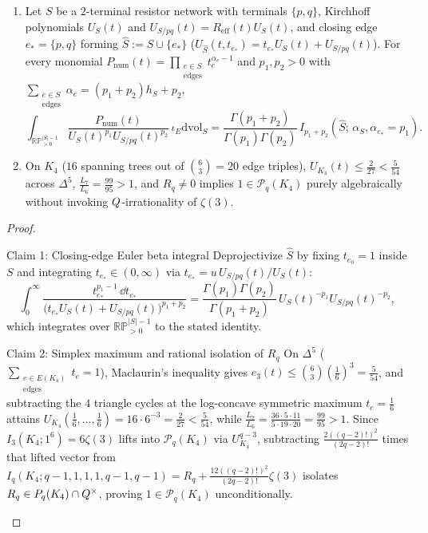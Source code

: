 \begin{lemma}
\label{lem:closing-edge-k4}
\leavevmode
\begin{enumerate}[label=(\arabic*),leftmargin=*]
  \item Let $S$ be a $2$-terminal resistor network with terminals $\{p,q\}$, Kirchhoff polynomials $U_S(t)$ and $U_{S/pq}(t) = R_{\mathrm{eff}}(t)U_S(t)$, and closing edge $e_* = \{p,q\}$ forming $\widehat{S} := S\cup\{e_*\}$ ($U_{\widehat{S}}(t,t_{e_*}) = t_{e_*}U_S(t) + U_{S/pq}(t)$). For every monomial $P_{\mathrm{num}}(t) = \prod_{\substack{e\in S\\\mathrm{edges}}}t_e^{\alpha_e-1}$ and $p_1,p_2 > 0$ with $\sum_{\substack{e\in S\\\mathrm{edges}}}\alpha_e = (p_1+p_2)h_S + p_2$,
  \[
  \int_{\mathbb{RP}^{|S|-1}_{>0}}\frac{P_{\mathrm{num}}(t)}{U_S(t)^{p_1}U_{S/pq}(t)^{p_2}}\,\iota_E\mathrm{dvol}_S = \frac{\Gamma(p_1+p_2)}{\Gamma(p_1)\Gamma(p_2)}\,I_{p_1+p_2}(\widehat{S};\, \alpha_S, \alpha_{e_*} = p_1).
  \]

  \item On $K_4$ ($16$ spanning trees out of $\binom{6}{3} = 20$ edge triples), $U_{K_4}(t) \le \frac{2}{27} < \frac{5}{54}$ across $\Delta^5$, $\frac{L_7}{L_6} = \frac{99}{95} > 1$, and $R_q \neq 0$ implies $1 \in \mathcal{P}_q(K_4)$ purely algebraically without invoking $Q$-irrationality of $\zeta(3)$.
\end{enumerate}
\end{lemma}

\begin{proof}\leavevmode
\begin{proofpart}{Claim 1: Closing-edge Euler beta integral}
Deprojectivize $\widehat{S}$ by fixing $t_{e_0} = 1$ inside $S$ and integrating $t_{e_*} \in (0,\infty)$ via $t_{e_*} = u\,U_{S/pq}(t)/U_S(t)$:
\[
\int_0^\infty\frac{t_{e_*}^{p_1-1}\,\dd t_{e_*}}{\bigl(t_{e_*}U_S(t) + U_{S/pq}(t)\bigr)^{p_1+p_2}} = \frac{\Gamma(p_1)\Gamma(p_2)}{\Gamma(p_1+p_2)}\,U_S(t)^{-p_1}U_{S/pq}(t)^{-p_2},
\]
which integrates over $\mathbb{RP}^{|S|-1}_{>0}$ to the stated identity.
\end{proofpart}
\begin{proofpart}{Claim 2: Simplex maximum and rational isolation of $R_q$}
On $\Delta^5$ ($\sum_{\substack{e\in E(K_4)\\\mathrm{edges}}}t_e = 1$), Maclaurin's inequality gives $e_3(t) \le \binom{6}{3}(\frac{1}{6})^3 = \frac{5}{54}$, and subtracting the $4$ triangle cycles at the log-concave symmetric maximum $t_e = \frac{1}{6}$ attains $U_{K_4}(\frac{1}{6},\dots,\frac{1}{6}) = 16\cdot 6^{-3} = \frac{2}{27} < \frac{5}{54}$, while $\frac{L_7}{L_6} = \frac{36\cdot 5\cdot 11}{5\cdot 19\cdot 20} = \frac{99}{95} > 1$. Since $I_3(K_4;1^6) = 6\zeta(3)$ lifts into $\mathcal{P}_q(K_4)$ via $U_{K_4}^{q-3}$, subtracting $\frac{2((q-2)!)^2}{(2q-2)!}$ times that lifted vector from $I_q(K_4;q-1,1,1,1,q-1,q-1) = R_q + \frac{12((q-2)!)^2}{(2q-2)!}\zeta(3)$ isolates $R_q \in P_q(K_4)\cap Q^\times$, proving $1 \in \mathcal{P}_q(K_4)$ unconditionally.
\end{proofpart}
\end{proof}

